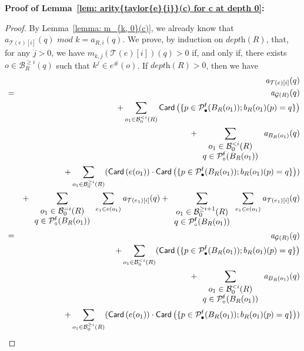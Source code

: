\documentclass{article}
\theoremstyle{plain}
\newcommand{\taylor}[2]{\mathcal{T}(#1)[#2]}
\newcommand{\groundof}[1]{\mathcal{G}(#1)}
\newcommand{\depthof}[1]{\textit{depth}(#1)}
\newcommand{\arity}[1]{{\textit{a}}_{#1}}
\newcommand{\Card}[1]{\textsf{Card}\left( #1 \right)}
\newcommand{\conclusionscirc}[1]{\mathcal{P}_\circ^{\textsf{f}}(#1)}
\newcommand{\conclusionsnotcirc}[1]{\mathcal{P}_\bullet^{\textsf{f}}(#1)}
\newcommand{\exactboxesatzero}[2]{\mathcal{B}_{0}^{=#2}(#1)}
\newcommand{\boxesatzerogeq}[2]{\mathcal{B}_0^{\geq #2}(#1)}
\newcommand{\boxesatzerosmaller}[2]{\mathcal{B}_0^{< #2}(#1)}
\begin{document}
\textbf{Proof of Lemma~\ref{lem: arity{taylor{e}{i}}(c) for c at depth 0}:}

\begin{proof}
By Lemma~\ref{lemma: m_{k, 0}(c)}, we already know that $\arity{\taylor{e}{i}}(q) \textit{ mod } k = \arity{R, i}(q)$. We prove, by induction on $\depthof{R}$, that, for any $j > 0$, we have $m_{k, j}(\taylor{e}{i})(q) > 0$ if, and only if, there exists $o \in \mathcal{B}_R^{\geq i}(q)$ such that $k^j \in e^\#(o)$. If $\depthof{R} > 0$, then we have
\begin{eqnarray*}
& & \arity{\taylor{e}{i}}(q)\\
& = & \arity{\groundof{R}}(q)\\
& & + \sum_{o_1 \in \boxesatzerosmaller{R}{i}} \Card{ \{ p \in \conclusionsnotcirc{B_R(o_1)} ; b_R(o_1)(p) = q \}}\\
& & + \sum_{\begin{array}{c} o_1 \in \boxesatzerosmaller{R}{i}\\ q \in \conclusionscirc{B_R(o_1)}  \end{array}} \arity{B_R(o_1)}(q)\\
& & + \sum_{o_1 \in \boxesatzerogeq{R}{i}} (\Card{e(o_1)} \cdot \Card{\{ p \in \conclusionsnotcirc{B_R(o_1)} ; b_R(o_1)(p) = q \}})\\
& & + \sum_{\begin{array}{c} o_1 \in \exactboxesatzero{R}{i}\\ q \in \conclusionscirc{B_R(o_1)} \end{array}} \sum_{e_1 \in e(o_1)} \arity{\taylor{e_1}{i}}(q) + \sum_{\begin{array}{c} o_1 \in \boxesatzerogeq{R}{i+1}\\ q \in \conclusionscirc{B_R(o_1)} \end{array}
} \sum_{e_1 \in e(o_1)}  \arity{\taylor{e_1}{i}}(q)\allowdisplaybreaks\\
& = & \arity{\groundof{R}}(q)\\
& & + \sum_{o_1 \in \boxesatzerosmaller{R}{i}} (\Card{ \{ p \in \conclusionsnotcirc{B_R(o_1)} ; b_R(o_1)(p) = q \}} \\
& & + \sum_{\begin{array}{c} o_1 \in \boxesatzerosmaller{R}{i}\\ q \in \conclusionscirc{B_R(o_1)}  \end{array}} \arity{B_R(o_1)}(q)\\
& & + \sum_{o_1 \in \boxesatzerogeq{R}{i}} (\Card{e(o_1)} \cdot \Card{\{ p \in \conclusionsnotcirc{B_R(o_1)} ; b_R(o_1)(p) = q \}})\\

\end{eqnarray*}
\end{proof}
\end{document}
